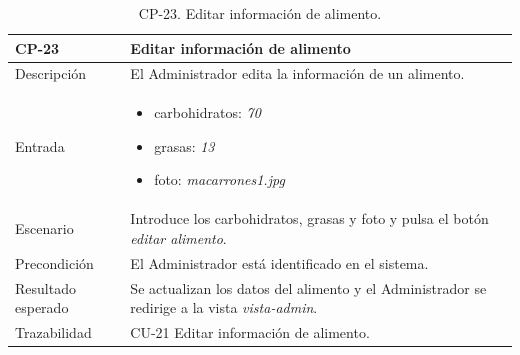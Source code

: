         \begin{table}[H]
            \centering
            \begin{tabularx}{1\textwidth} { 
                | >{\raggedright\arraybackslash}X 
                | >{\raggedright\arraybackslash}X 
                | >{\raggedright\arraybackslash}X 
                |  }
            \hline
            \textbf{CP-23}     & \textbf{Editar información de alimento}                             \\ \hline
            Descripción        & El Administrador edita la información de un alimento.      \\ \hline
            Entrada            & \begin{itemize}
                \item carbohidratos: \textit{70}
                \item grasas: \textit{13}
                \item foto: \textit{macarrones1.jpg}
            \end{itemize} \\ \hline
            Escenario          & Introduce los carbohidratos, grasas y foto y pulsa el botón \textit{editar alimento}.                            \\ \hline
            Precondición          & El Administrador está identificado en el sistema.                             \\ \hline
          
            Resultado esperado & Se actualizan los datos del alimento y el Administrador se redirige a la vista \textit{vista-admin}. \\ \hline
            Trazabilidad & CU-21 Editar información de alimento.\\ \hline
        \end{tabularx}
        \caption{CP-23. Editar información de alimento.}
        \label{table:CP-23}
            \end{table}
    



